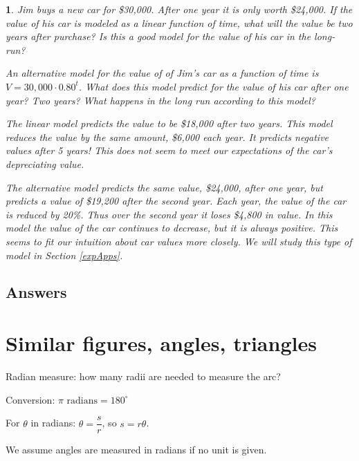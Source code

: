 \documentclass{amsbook}
\newtheorem{exc}{}
\newenvironment{ex}{\begin{exc}\normalfont}{\end{exc}}
\numberwithin{section}{chapter}
\numberwithin{equation}{chapter}
\begin{document}
\begin{ex} \label{JimCar}
	Jim buys a new car for \$30,000. After one year it is only worth \$24,000. If the value of his car is modeled as a linear function of time, what will the value be two years after purchase? Is this a good model for the value of his car in the long-run?
	
	An alternative model for the value of of Jim's car as a function of time is $V = 30,000\cdot 0.80^t$. What does this model predict for the value of his car after one year? Two years? What happens in the long run according to this model?
	\begin{sol}
		The linear model predicts the value to be \$18,000 after two years. This model reduces the value by the same amount, \$6,000 each year. It predicts negative values after 5 years! This does not seem to meet our expectations of the car's depreciating value.
		
		The alternative model predicts the same value, \$24,000, after one year, but predicts a value of \$19,200 after the second year. Each year, the value of the car is reduced by 20\%. Thus over the second year it loses \$4,800 in value. In this model the value of the car continues to decrease, but it is always positive. This seems to fit our intuition about car values more closely. We will study this type of model in Section \ref{expApps}.
	\end{sol}
\end{ex}


\subsection*{Answers \nopunct} \hfill
\begin{multicols}{2}
	
\end{multicols}



	
\newpage
\section{Similar figures, angles, triangles} \label{simfigsection}

Radian measure: how many radii are needed to measure the arc?

Conversion: $\pi \text{ radians} = 180 ^\circ$

For $\theta$ in radians:  $\theta = \dfrac{s}{r}$, so $s = r\theta$.

We assume angles are measured in radians if no unit is given.
\end{document}
